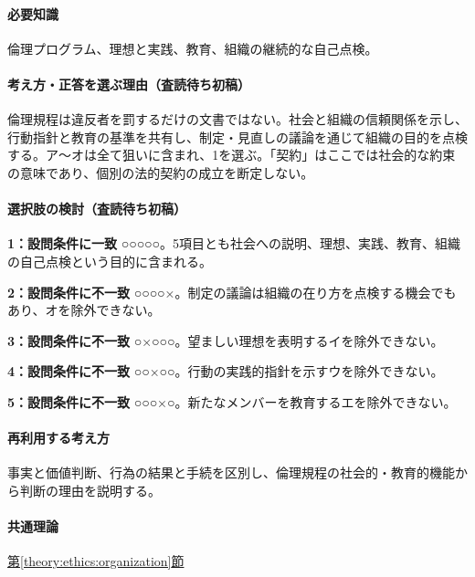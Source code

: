 \paragraph{必要知識} 倫理プログラム、理想と実践、教育、組織の継続的な自己点検。

\paragraph{考え方・正答を選ぶ理由（査読待ち初稿）} 倫理規程は違反者を罰するだけの文書ではない。社会と組織の信頼関係を示し、行動指針と教育の基準を共有し、制定・見直しの議論を通じて組織の目的を点検する。ア〜オは全て狙いに含まれ、1を選ぶ。「契約」はここでは社会的な約束の意味であり、個別の法的契約の成立を断定しない。

\paragraph{選択肢の検討（査読待ち初稿）}\mbox{}\par

\noindent\textbf{1：設問条件に一致} ○○○○○。5項目とも社会への説明、理想、実践、教育、組織の自己点検という目的に含まれる。\par

\noindent\textbf{2：設問条件に不一致} ○○○○×。制定の議論は組織の在り方を点検する機会でもあり、オを除外できない。\par

\noindent\textbf{3：設問条件に不一致} ○×○○○。望ましい理想を表明するイを除外できない。\par

\noindent\textbf{4：設問条件に不一致} ○○×○○。行動の実践的指針を示すウを除外できない。\par

\noindent\textbf{5：設問条件に不一致} ○○○×○。新たなメンバーを教育するエを除外できない。\par

\paragraph{再利用する考え方} 事実と価値判断、行為の結果と手続を区別し、倫理規程の社会的・教育的機能から判断の理由を説明する。

\paragraph{共通理論} \hyperref[theory:ethics:organization]{第\ref*{theory:ethics:organization}節}

